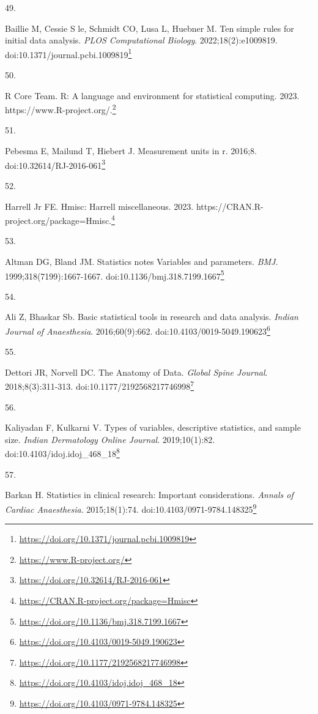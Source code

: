 \documentclass[
  a4paper,
]{book}
\newlength{\cslhangindent}
\newlength{\csllabelwidth}
\newlength{\cslentryspacingunit} %
\newenvironment{CSLReferences}[2] %
 {%
  \setlength{\parindent}{0pt}
  \ifodd #1
  \let\oldpar\par
  \def\par{\hangindent=\cslhangindent\oldpar}
  \fi
  \setlength{\parskip}{#2\cslentryspacingunit}
 }%
 {}
\newcommand{\CSLLeftMargin}[1]{\parbox[t]{\csllabelwidth}{#1}}
\newcommand{\CSLRightInline}[1]{\parbox[t]{\linewidth - \csllabelwidth}{#1}\break}
\renewcommand{\href}[2]{#2\footnote{\url{#1}}}
\begin{document}
\begin{CSLReferences}{0}{0}
\leavevmode{}%
\CSLLeftMargin{49. }%
\CSLRightInline{Baillie M, Cessie S le, Schmidt CO, Lusa L, Huebner M. Ten simple rules for initial data analysis. \emph{PLOS Computational Biology}. 2022;18(2):e1009819. doi:\href{https://doi.org/10.1371/journal.pcbi.1009819}{10.1371/journal.pcbi.1009819}}

\leavevmode{}%
\CSLLeftMargin{50. }%
\CSLRightInline{R Core Team. R: A language and environment for statistical computing. 2023. \href{https://www.R-project.org/}{https://www.R-project.org/.}}

\leavevmode{}%
\CSLLeftMargin{51. }%
\CSLRightInline{Pebesma E, Mailund T, Hiebert J. Measurement units in {\textbraceleft}r{\textbraceright}. 2016;8. doi:\href{https://doi.org/10.32614/RJ-2016-061}{10.32614/RJ-2016-061}}

\leavevmode{}%
\CSLLeftMargin{52. }%
\CSLRightInline{Harrell Jr FE. Hmisc: Harrell miscellaneous. 2023. \href{https://CRAN.R-project.org/package=Hmisc}{https://CRAN.R-project.org/package=Hmisc.}}

\leavevmode{}%
\CSLLeftMargin{53. }%
\CSLRightInline{Altman DG, Bland JM. Statistics notes Variables and parameters. \emph{BMJ}. 1999;318(7199):1667-1667. doi:\href{https://doi.org/10.1136/bmj.318.7199.1667}{10.1136/bmj.318.7199.1667}}

\leavevmode{}%
\CSLLeftMargin{54. }%
\CSLRightInline{Ali Z, Bhaskar Sb. Basic statistical tools in research and data analysis. \emph{Indian Journal of Anaesthesia}. 2016;60(9):662. doi:\href{https://doi.org/10.4103/0019-5049.190623}{10.4103/0019-5049.190623}}

\leavevmode{}%
\CSLLeftMargin{55. }%
\CSLRightInline{Dettori JR, Norvell DC. The Anatomy of Data. \emph{Global Spine Journal}. 2018;8(3):311-313. doi:\href{https://doi.org/10.1177/2192568217746998}{10.1177/2192568217746998}}

\leavevmode{}%
\CSLLeftMargin{56. }%
\CSLRightInline{Kaliyadan F, Kulkarni V. Types of variables, descriptive statistics, and sample size. \emph{Indian Dermatology Online Journal}. 2019;10(1):82. doi:\href{https://doi.org/10.4103/idoj.idoj_468_18}{10.4103/idoj.idoj\_468\_18}}

\leavevmode{}%
\CSLLeftMargin{57. }%
\CSLRightInline{Barkan H. Statistics in clinical research: Important considerations. \emph{Annals of Cardiac Anaesthesia}. 2015;18(1):74. doi:\href{https://doi.org/10.4103/0971-9784.148325}{10.4103/0971-9784.148325}}


\end{CSLReferences}
\end{document}
